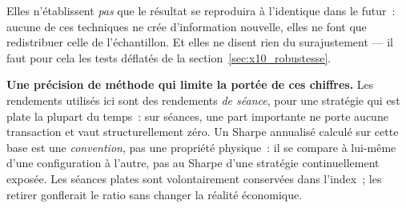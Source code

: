 Elles n'établissent \emph{pas} que le résultat se reproduira à l'identique
dans le futur~: aucune de ces techniques ne crée d'information nouvelle, elles
ne font que redistribuer celle de l'échantillon. Et elles ne disent rien du
surajustement --- il faut pour cela les tests déflatés de la
section~\ref{sec:x10_robustesse}.

\begin{warningbox}
\textbf{Une précision de méthode qui limite la portée de ces chiffres.} Les
rendements utilisés ici sont des rendements \emph{de séance}, pour une
stratégie qui est plate la plupart du temps~: sur \XTenSampleSessions{}
séances, une part importante ne porte aucune transaction et vaut
structurellement zéro. Un Sharpe annualisé calculé sur cette base est une
\emph{convention}, pas une propriété physique~: il se compare à lui-même d'une
configuration à l'autre, pas au Sharpe d'une stratégie continuellement
exposée. Les séances plates sont volontairement conservées dans l'index~; les
retirer gonflerait le ratio sans changer la réalité économique.
\end{warningbox}
